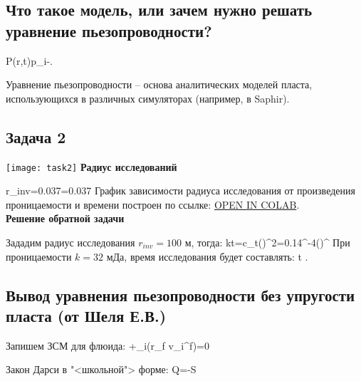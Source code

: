 \documentclass[main.tex]{subfiles}
\begin{document}
\subsection{Что такое модель, или зачем нужно решать уравнение пьезопроводности?}

\beq
P(r,t)\approx p_i-.
\eeq

Уравнение пьезопроводности -- основа аналитических моделей пласта, использующихся в различных симуляторах (например, в Saphir).

\subsection{Задача 2}

\texttt{[image: task2]}
\textbf{Радиус исследований}

\beq
r_{inv}=0.037=0.037
\eeq
График зависимости радиуса исследования от произведения проницаемости и времени построен по ссылке: \href{https://colab.research.google.com/github/mualal/notebooks-source/blob/master/7_exploration_radius.ipynb}{OPEN IN COLAB}.
\\

\textbf{Решение обратной задачи}

Зададим радиус исследования $r_{inv}=100\text{ м}$, тогда:
\beq
kt=\varphi\mu c_t\left(\right)^2=0.14^{-4}\cdot \left(\right)^{}\cdot{}
\eeq
При проницаемости $k=32\text{ мДа}$, время исследования будет составлять:
\beq
t\approx{} .
\eeq


\subsection{Вывод уравнения пьезопроводности без упругости пласта (от Шеля Е.В.)}

Запишем ЗСМ для флюида:
\beq
{}+\partial_i\left(r_f v_i^f\right)=0
\eeq

Закон Дарси в "<школьной"> форме:
\beq
Q=-S
\eeq
\end{document}
